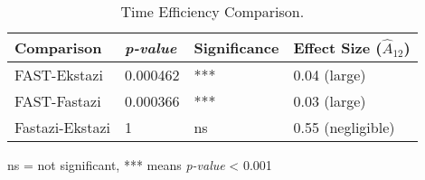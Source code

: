 \begin{table}[!hbt]
\centering
\label{tab:efficiency_stats}
\begin{tabular}{@{}llll@{}}
\toprule
Comparison      & \textit{p-value}  & Significance & Effect Size ($\hat{A}_{12}$) \\ \midrule
FAST-Ekstazi    & 0.000462 & ***          & 0.04 (large)      \\
FAST-Fastazi    & 0.000366 & ***          & 0.03 (large)      \\
Fastazi-Ekstazi & 1        & ns           & 0.55 (negligible) \\ \bottomrule
\end{tabular}
\begin{flushleft}
\footnotesize
\hspace{2em}ns = not significant, *** means \textit{p-value} < 0.001
\end{flushleft}
\caption{Time Efficiency Comparison.}
\end{table}
